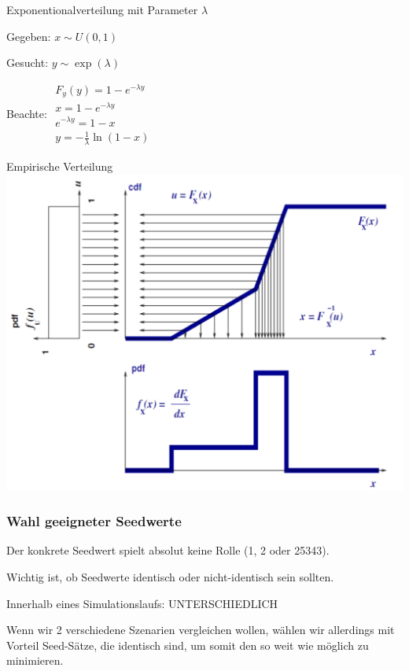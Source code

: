 \begin{multicols}{2}
	\begin{example} 
		Exponentionalverteilung mit Parameter $\lambda$ \\
		\begin{compactitem}
			\item Gegeben: $x\sim U(0, 1)$
			\item Gesucht: $y\sim \exp (\lambda)$
			\item Beachte: $\begin{array}{l}
								F_y(y) = 1-e^{-\lambda y} \\
								x = 1-e^{-\lambda y} \\
								e^{-\lambda y} = 1-x\\
								y = -\frac{1}{\lambda}\ln (1-x)
							\end{array}$
		\end{compactitem}
	\end{example}
	\begin{example} 
		Empirische Verteilung \\
		\includegraphics[width=1\textwidth]{pictures/inversionsmethode2} 
	\end{example}
\end{multicols}

\subsubsection{Wahl geeigneter Seedwerte}
\begin{compactitem}
	\item Der konkrete Seedwert spielt absolut keine Rolle (1, 2 oder 25343).
	\item Wichtig ist, ob Seedwerte identisch oder nicht-identisch sein sollten.
	\item Innerhalb eines Simulationslaufs: UNTERSCHIEDLICH
	\item Wenn wir 2 verschiedene Szenarien vergleichen wollen, wählen wir allerdings mit Vorteil Seed-Sätze, die identisch sind, um somit den  so weit wie möglich zu minimieren.
\end{compactitem}
